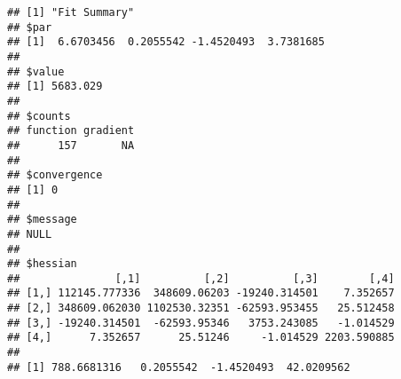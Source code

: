 \documentclass[
]{article}
\newenvironment{Shaded}{\begin{snugshade}}{\end{snugshade}}
\newcommand{\DecValTok}[1]{\textcolor[rgb]{0.00,0.00,0.81}{#1}}
\newcommand{\FloatTok}[1]{\textcolor[rgb]{0.00,0.00,0.81}{#1}}
\newcommand{\KeywordTok}[1]{\textcolor[rgb]{0.13,0.29,0.53}{\textbf{#1}}}
\newcommand{\NormalTok}[1]{#1}
\newcommand{\OperatorTok}[1]{\textcolor[rgb]{0.81,0.36,0.00}{\textbf{#1}}}
\newcommand{\StringTok}[1]{\textcolor[rgb]{0.31,0.60,0.02}{#1}}
\begin{document}
\begin{Shaded}
\end{Shaded}

\begin{verbatim}
## [1] "Fit Summary"
## $par
## [1]  6.6703456  0.2055542 -1.4520493  3.7381685
## 
## $value
## [1] 5683.029
## 
## $counts
## function gradient 
##      157       NA 
## 
## $convergence
## [1] 0
## 
## $message
## NULL
## 
## $hessian
##               [,1]          [,2]          [,3]        [,4]
## [1,] 112145.777336  348609.06203 -19240.314501    7.352657
## [2,] 348609.062030 1102530.32351 -62593.953455   25.512458
## [3,] -19240.314501  -62593.95346   3753.243085   -1.014529
## [4,]      7.352657      25.51246     -1.014529 2203.590885
## 
## [1] 788.6681316   0.2055542  -1.4520493  42.0209562
\end{verbatim}

\begin{Shaded}
\end{Shaded}
\end{document}
